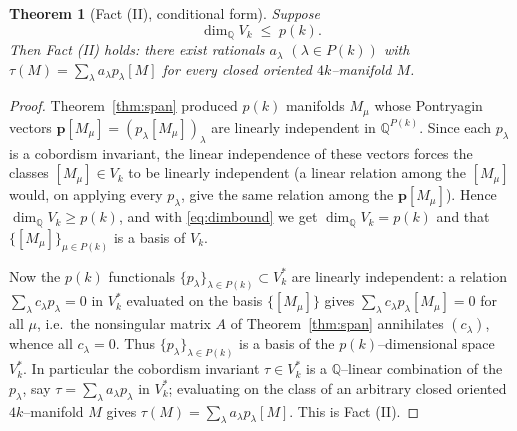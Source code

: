 \documentclass[12pt]{article}
\newtheorem{theorem}{Theorem}
\theoremstyle{definition}
\begin{document}
\begin{theorem}[Fact (II), conditional form]\label{thm:factII}
Suppose
\[
\dim_{\mathbb Q}V_k\;\le\;p(k).
\tag{$\sharp$}\label{eq:dimbound}
\]
Then Fact \textnormal{(II)} holds: there exist rationals $a_\lambda$
$(\lambda\in P(k))$ with $\tau(M)=\sum_\lambda a_\lambda p_\lambda[M]$ for every closed
oriented $4k$--manifold $M$.
\end{theorem}

\begin{proof}
Theorem~\ref{thm:span} produced $p(k)$ manifolds $M_\mu$ whose Pontryagin vectors
$\mathbf p[M_\mu]=(p_\lambda[M_\mu])_\lambda$ are linearly independent in
$\mathbb Q^{P(k)}$.  Since each $p_\lambda$ is a cobordism invariant, the linear
independence of these vectors forces the classes $[M_\mu]\in V_k$ to be linearly
independent (a linear relation among the $[M_\mu]$ would, on applying every $p_\lambda$,
give the same relation among the $\mathbf p[M_\mu]$).  Hence
$\dim_{\mathbb Q}V_k\ge p(k)$, and with \eqref{eq:dimbound} we get
$\dim_{\mathbb Q}V_k=p(k)$ and that $\{[M_\mu]\}_{\mu\in P(k)}$ is a basis of $V_k$.

Now the $p(k)$ functionals $\{p_\lambda\}_{\lambda\in P(k)}\subset V_k^\ast$ are linearly
independent: a relation $\sum_\lambda c_\lambda p_\lambda=0$ in $V_k^\ast$ evaluated on
the basis $\{[M_\mu]\}$ gives $\sum_\lambda c_\lambda p_\lambda[M_\mu]=0$ for all $\mu$,
i.e.\ the nonsingular matrix $A$ of Theorem~\ref{thm:span} annihilates $(c_\lambda)$,
whence all $c_\lambda=0$.  Thus $\{p_\lambda\}_{\lambda\in P(k)}$ is a basis of the
$p(k)$--dimensional space $V_k^\ast$.  In particular the cobordism invariant
$\tau\in V_k^\ast$ is a $\mathbb Q$--linear combination of the $p_\lambda$, say
$\tau=\sum_\lambda a_\lambda p_\lambda$ in $V_k^\ast$; evaluating on the class of an
arbitrary closed oriented $4k$--manifold $M$ gives
$\tau(M)=\sum_\lambda a_\lambda p_\lambda[M]$.  This is Fact (II).
\end{proof}
\end{document}
